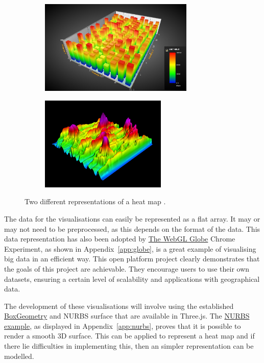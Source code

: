 \documentclass[a4paper]{article}
\begin{document}
{		\begin{figure}[H]
			\begin{subfigure}[b]{0.495\textwidth}
                \includegraphics[width=\textwidth,height=4.5cm]{images/heat-map-1}
	        \end{subfigure}
	        \begin{subfigure}[b]{0.495\textwidth}
                \includegraphics[width=\textwidth,height=4.5cm]{images/heat-map-2}
	        \end{subfigure}
			\caption{Two different representations of a heat map \citep{tuomainen2014financial} \citep{fuchs2006physiological}.}
			\label{fig:heat_maps}
		\end{figure}
		
		The data for the visualisations can easily be represented as a flat array. It may or may not need to be preprocessed, as this depends on the format of the data. This data representation has also been adopted by \href{https://www.chromeexperiments.com/globe}{The WebGL Globe} Chrome Experiment, as shown in Appendix~\ref{app:globe}, is a great example of visualising big data in an efficient way. This open platform project clearly demonstrates that the goals of this project are achievable. They encourage users to use their own datasets, ensuring a certain level of scalability and applications with geographical data.
		
		The development of these visualisations will involve using the established \href{http://threejs.org/docs/#Reference/Extras.Geometries/BoxGeometry}{BoxGeometry} and NURBS surface that are available in Three.js. The \href{http://threejs.org/examples/webgl_geometry_nurbs.html}{NURBS example}, as displayed in Appendix~\ref{app:nurbs}, proves that it is possible to render a smooth 3D surface. This can be applied to represent a heat map and if there lie difficulties in implementing this, then an simpler representation can be modelled.
		
}
\end{document}
